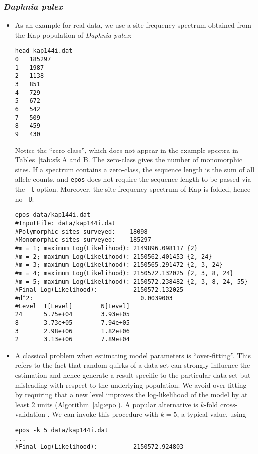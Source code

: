\documentclass[a4paper, english]{article}
\newcommand{\ty}{\texttt}
\begin{document}
\subsubsection{\textit{Daphnia pulex}}
\begin{itemize}
\item As an example for real data, we use a site frequency spectrum obtained from
  the Kap population of \textit{Daphnia pulex}:
\begin{verbatim}
head kap144i.dat 
0	185297
1	1987
2	1138
3	851
4	729
5	672
6	542
7	509
8	459
9	430
\end{verbatim}
Notice the ``zero-class'', which does not appear in the example
spectra in Tables~\ref{tab:sfs}A and B. The zero-class gives the
number of monomorphic sites. If a spectrum contains a zero-class, the
sequence length is the sum of all allele counts, and \ty{epos} does not
require the sequence length to be passed via the \ty{-l}
option. Moreover, the site frequency spectrum of Kap is folded, hence
no \ty{-U}:
\begin{verbatim}
epos data/kap144i.dat 
#InputFile:	data/kap144i.dat
#Polymorphic sites surveyed:	18098
#Monomorphic sites surveyed:	185297
#m = 1; maximum Log(Likelihood): 2149896.098117	{2}
#m = 2; maximum Log(Likelihood): 2150562.401453	{2, 24}
#m = 3; maximum Log(Likelihood): 2150565.291472	{2, 3, 24}
#m = 4; maximum Log(Likelihood): 2150572.132025	{2, 3, 8, 24}
#m = 5; maximum Log(Likelihood): 2150572.238482	{2, 3, 8, 24, 55}
#Final Log(Likelihood):          2150572.132025
#d^2:                              0.0039003
#Level  T[Level]        N[Level]
24      5.75e+04        3.93e+05
8       3.73e+05        7.94e+05
3       2.98e+06        1.82e+06
2       3.13e+06        7.89e+04                              
\end{verbatim}
\item A classical problem when estimating model parameters is
  ``over-fitting''. This refers to the fact that random quirks of a
  data set can strongly influence the estimation and hence
  generate a result specific to the particular data set but misleading
  with respect to the underlying population. We avoid over-fitting by
  requiring that a new level improves the log-likelihood of the model
  by at least 2 units (Algorithm~\ref{alg:epo}). A popular alternative is $k$-fold
  cross-validation \citep[p. 118f]{goo16:dee}. We can invoke this
  procedure with $k=5$, a typical value, using
\begin{verbatim}
epos -k 5 data/kap144i.dat 
...
#Final Log(Likelihood):          2150572.924803

\end{verbatim}
\end{itemize}
\end{document}
